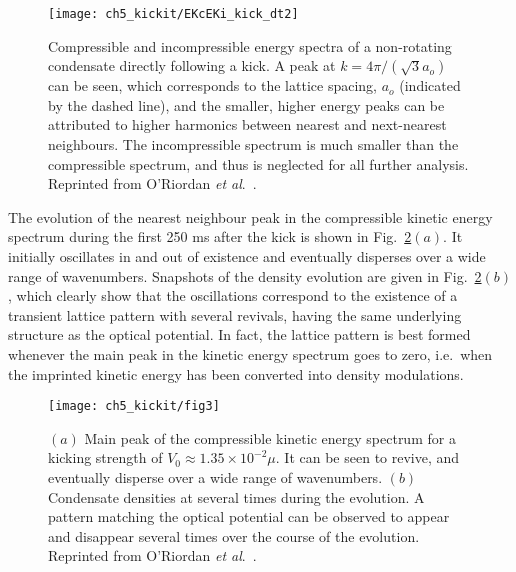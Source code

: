 \begin{figure}
    \centering
    \texttt{[image: ch5\_kickit/EKcEKi\_kick\_dt2]}
    \caption[Compressible and incompressible energy spectra of a non-rotating condensate directly following a kick.]{Compressible and incompressible energy spectra of a non-rotating condensate directly following a kick. A peak at $k=4\pi/(\sqrt{3}a_o)$ can be seen, which corresponds to the lattice spacing, $a_o$ (indicated by the dashed line), and the smaller, higher energy peaks can be attributed to higher harmonics between nearest and next-nearest neighbours. The incompressible spectrum is much smaller than the compressible spectrum, and thus is neglected for all further analysis. Reprinted from O'Riordan {\textit{et al}.}~\cite{VTX:oriordan_pra_2016}.}
    \label{fig:ekc_eki_novtx}
\end{figure}

The evolution of the nearest neighbour peak in the compressible kinetic energy spectrum during the first 250 ms after the kick is shown in Fig.~\ref{fig:novtx_p5k}$(a)$. It initially oscillates in and out of existence and eventually disperses over a wide range of wavenumbers. Snapshots of the density evolution are given in Fig.~\ref{fig:novtx_p5k}$(b)$, which clearly show that the oscillations correspond to the existence of a transient lattice pattern with several revivals, having the same underlying structure as the optical potential. In fact, the lattice pattern is best formed whenever the main peak in the kinetic energy spectrum goes to zero, i.e.~when the imprinted kinetic energy has been converted into density modulations.

\begin{figure}
    \centering
	\texttt{[image: ch5\_kickit/fig3]}
	\caption[Effect of kicking on non-rotating condensate.]{$(a)$ Main peak of the compressible kinetic energy spectrum for a kicking strength of $V_0 \approx 1.35\times10^{-2}\mu$. It can be seen to revive, and eventually disperse over a wide range of wavenumbers. $(b)$ Condensate densities at several times during the evolution. A pattern matching the optical potential can be observed to appear and disappear several times over the course of the evolution. Reprinted from O'Riordan {\textit{et al}.}~\cite{VTX:oriordan_pra_2016}.}
	\label{fig:novtx_p5k}
\end{figure}


